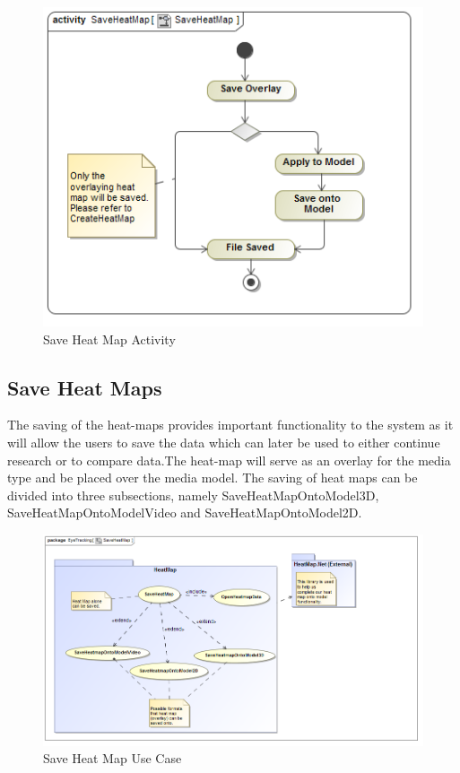 	\begin{figure}[!ht]
		\centering
		\includegraphics[scale=0.5]{Diagrams/Activity_Diagram__SaveHeatMap__SaveHeatMap.png}
		\caption{Save Heat Map Activity}
	\end{figure}
	
\subsection{Save Heat Maps}
	The saving of the heat-maps provides important functionality to the system as it will allow the users to save the data which can later be used to either continue research or to compare data.The heat-map will serve as an overlay for the media type and be placed over the media model. The saving of heat maps can be divided into three subsections, namely SaveHeatMapOntoModel3D, SaveHeatMapOntoModelVideo and SaveHeatMapOntoModel2D.
	\newline
	
	\begin{figure}[!ht]
		\centering
		\includegraphics[scale=0.5]{Diagrams/Use_Case_Diagram__SaveHeatMap.png}\newline
		\caption{Save Heat Map Use Case}
	\end{figure}		
		
